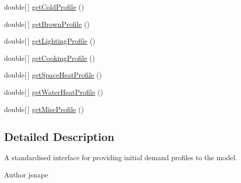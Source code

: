 \begin{DoxyCompactItemize}
\item 
double\mbox{[}$\,$\mbox{]} \hyperlink{interfaceuk_1_1ac_1_1dmu_1_1iesd_1_1cascade_1_1util_1_1profilegenerators_1_1_profile_generator_a30db698c07287d431d42818e24f65b67}{get\-Cold\-Profile} ()
\item 
double\mbox{[}$\,$\mbox{]} \hyperlink{interfaceuk_1_1ac_1_1dmu_1_1iesd_1_1cascade_1_1util_1_1profilegenerators_1_1_profile_generator_abcbf7d1c99ee11c5d640933b87472b50}{get\-Brown\-Profile} ()
\item 
double\mbox{[}$\,$\mbox{]} \hyperlink{interfaceuk_1_1ac_1_1dmu_1_1iesd_1_1cascade_1_1util_1_1profilegenerators_1_1_profile_generator_a5d5ddc5c30e0d36e9a02ea99822d31a2}{get\-Lighting\-Profile} ()
\item 
double\mbox{[}$\,$\mbox{]} \hyperlink{interfaceuk_1_1ac_1_1dmu_1_1iesd_1_1cascade_1_1util_1_1profilegenerators_1_1_profile_generator_a1dcc58776daaf62cc7274e429011a057}{get\-Cooking\-Profile} ()
\item 
double\mbox{[}$\,$\mbox{]} \hyperlink{interfaceuk_1_1ac_1_1dmu_1_1iesd_1_1cascade_1_1util_1_1profilegenerators_1_1_profile_generator_a6daf282d4089cbb713ac76516ef42374}{get\-Space\-Heat\-Profile} ()
\item 
double\mbox{[}$\,$\mbox{]} \hyperlink{interfaceuk_1_1ac_1_1dmu_1_1iesd_1_1cascade_1_1util_1_1profilegenerators_1_1_profile_generator_a704e83b65e4c7d67d501de2a1fda1047}{get\-Water\-Heat\-Profile} ()
\item 
double\mbox{[}$\,$\mbox{]} \hyperlink{interfaceuk_1_1ac_1_1dmu_1_1iesd_1_1cascade_1_1util_1_1profilegenerators_1_1_profile_generator_ac767903804d0de680508c761192ebcbf}{get\-Misc\-Profile} ()
\end{DoxyCompactItemize}


\subsection{Detailed Description}
A standardised interface for providing initial demand profiles to the model. 

\begin{DoxyAuthor}{Author}
jsnape 
\end{DoxyAuthor}


